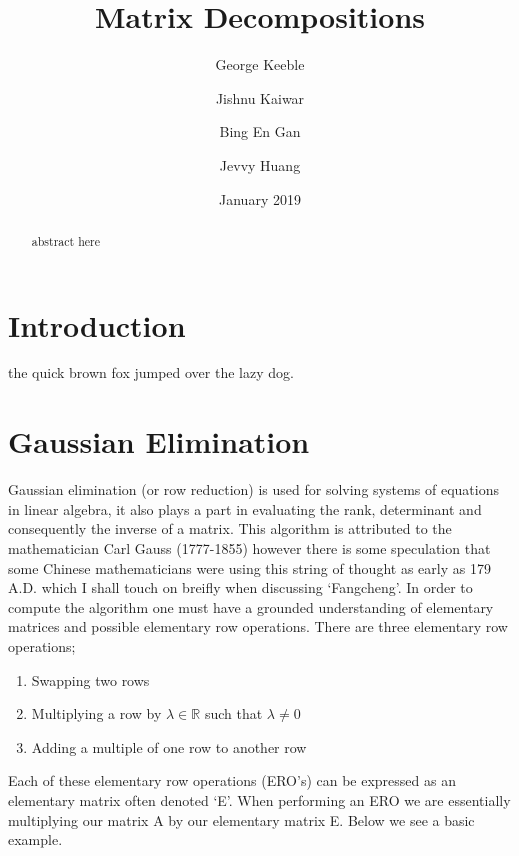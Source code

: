 \documentclass[12pt,reqno,twoside,titlepage]{article}
\theoremstyle{definition}
\begin{document}
\newcommand{\norm}[1]{\left\lVert#1\right\rVert}

\title{Matrix Decompositions}
\author{George Keeble
  \and
  Jishnu Kaiwar
  \and
  Bing En Gan
  \and
  Jevvy Huang
}
\date{January 2019}

\maketitle

\begin{abstract}
  abstract here
\end{abstract}

\section{Introduction}
\label{sec:int}
the quick brown fox jumped over the lazy dog.

\section{Gaussian Elimination}
\label{sec:gaus}

Gaussian elimination (or row reduction) is used for solving systems of equations in linear algebra, it also plays a part in evaluating the rank, determinant and consequently the inverse of a matrix.
This algorithm is attributed to the mathematician Carl Gauss (1777-1855) however there is some speculation that some Chinese mathematicians were using this string of thought as early as 179 A.D. which I shall touch on breifly when discussing ‘Fangcheng’.
In order to compute the algorithm one must have a grounded understanding of elementary matrices and possible elementary row operations.
There are three elementary row operations;

\begin{enumerate}
\item Swapping two rows
\item Multiplying a row by $\lambda \in \mathbb{R}$ such that $\lambda \ne 0$
\item Adding a multiple of one row to another row
\end{enumerate}

Each of these elementary row operations (ERO’s) can be expressed as an elementary matrix often denoted ‘E’. When performing an ERO we are essentially multiplying our matrix A by our elementary matrix E. Below we see a basic example.
\end{document}
